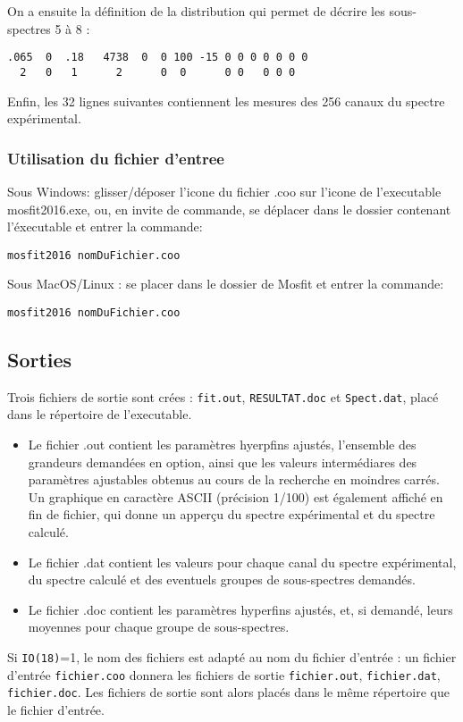 On a ensuite la définition de la distribution qui permet de décrire les sous-spectres 5 à 8 :
\begin{lstlisting}[frame=single]
.065  0  .18   4738  0  0 100 -15 0 0 0 0 0 0 0
  2   0   1      2      0  0      0 0   0 0 0
\end{lstlisting}
Enfin, les 32 lignes suivantes contiennent les mesures des 256 canaux du spectre expérimental.
\FloatBarrier


\subsubsection{Utilisation du fichier d'entree}
Sous Windows: glisser/déposer l'icone du fichier .coo sur l'icone de l'executable mosfit2016.exe, 
ou, en invite de commande, se déplacer dans le dossier contenant l'éxecutable et entrer la commande: 

\begin{lstlisting}[frame=single]
mosfit2016 nomDuFichier.coo
\end{lstlisting}

Sous MacOS/Linux : se placer dans le dossier de Mosfit et entrer la commande: 

\begin{lstlisting}[frame=single]
mosfit2016 nomDuFichier.coo
\end{lstlisting}
\FloatBarrier
\subsection{Sorties}
Trois fichiers de sortie sont crées :  \lstinline{fit.out}, \lstinline{RESULTAT.doc} et \lstinline{Spect.dat}, placé dans le répertoire de l'executable.
\begin{itemize}
\item Le fichier .out contient les paramètres hyerpfins ajustés, l'ensemble des grandeurs demandées en option, ainsi que les valeurs intermédiares des paramètres ajustables obtenus au cours de la recherche en moindres carrés.
     Un graphique en caractère ASCII (précision 1/100) est également affiché en fin de fichier, qui donne un apperçu du spectre expérimental et du spectre calculé.
\item Le fichier .dat contient les valeurs pour chaque canal du spectre expérimental, du spectre calculé et des eventuels groupes de sous-spectres demandés.
\item Le fichier .doc contient les paramètres hyperfins ajustés, et, si demandé, leurs moyennes pour chaque groupe de sous-spectres. 
\end{itemize}
Si \lstinline{IO(18)}=1, le nom des fichiers est adapté au nom du fichier d'entrée : un fichier d'entrée \lstinline{fichier.coo} donnera les fichiers de sortie \lstinline{fichier.out}, \lstinline{fichier.dat}, \lstinline{fichier.doc}.
Les fichiers de sortie sont alors placés dans le même répertoire que le fichier d'entrée.
